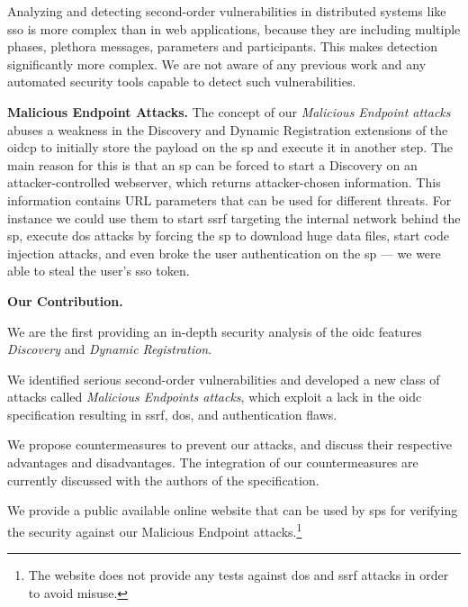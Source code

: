 \documentclass[conference,compsoc]{IEEEtran}
\renewenvironment{itemize}{\begin{compactitem}}{\end{compactitem}}
\renewcommand*{\paragraph}[1]{\vspace{2mm}\noindent\textbf{#1.}}
\begin{document}
Analyzing and detecting second-order vulnerabilities in distributed systems like \gls{sso} is more complex than in web applications, because they are including multiple phases, plethora messages, parameters and participants.
This makes detection significantly more complex. 
We are not aware of any previous work and any automated security tools capable to detect such vulnerabilities.



\paragraph{Malicious Endpoint Attacks}
The concept of our \emph{Malicious Endpoint attacks} abuses a weakness in the Discovery and Dynamic Registration extensions of the \gls{oidcp} to initially store the payload on the \gls{sp} and execute it in another step.
The main reason for this is that an \gls{sp} can be forced to start a Discovery on an attacker-controlled webserver, which returns attacker-chosen information.
This information contains URL parameters that can be used for different threats. 
For instance we could use them to start \gls{ssrf} targeting the internal network behind the \gls{sp}, execute \gls{dos} attacks by forcing the \gls{sp} to download huge data files, start code injection attacks, and even broke the user authentication on the \gls{sp} --- we were able to steal the user's \gls{sso} token.

\paragraph{Our Contribution} \\
\begin{itemize}
 \item We are the first providing an in-depth security analysis of the \gls{oidc} features \emph{Discovery} and \emph{Dynamic Registration}.
 \item We identified serious second-order vulnerabilities and developed a new class of attacks called \emph{Malicious Endpoints attacks}, which exploit a lack in the \gls{oidc} specification resulting in \gls{ssrf}, \gls{dos}, and authentication flaws.
 \item We propose countermeasures to prevent our attacks, and discuss their respective advantages and disadvantages.
       The integration of our countermeasures are currently discussed with the authors of the specification.
 \item We provide a public available online website that can be used by \glspl{sp} for verifying the security against our Malicious Endpoint attacks.\footnote{The website does not provide any tests against \gls{dos} and \gls{ssrf} attacks in order to avoid misuse. }
\end{itemize}
\vspace{2mm}
\end{document}
